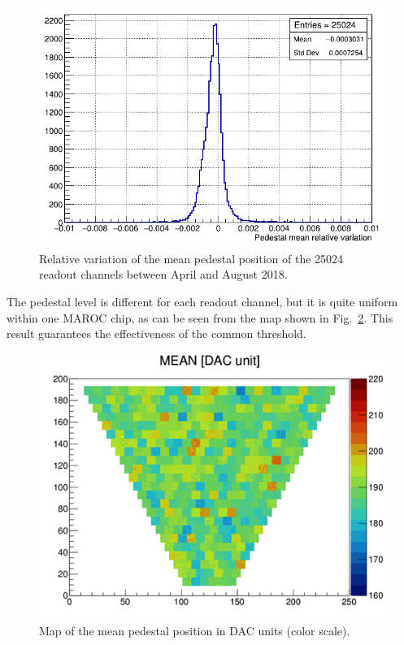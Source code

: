 \documentclass[5p,times,twocolumn]{elsarticle}
\begin{document}
\begin{figure}[t]
\begin{center}
\includegraphics[width=1.0\columnwidth]{PedestalMeanVariation.png}
\end{center}
\caption{Relative variation of the mean pedestal position of the 25024 readout channels between April and August
  2018.}
\label{fig:PedestalMean}
\end{figure}

The pedestal level is different for each readout channel, but it is quite uniform within one MAROC chip, as can be
seen from the map shown in Fig.~\ref{fig:PedestalMap}. This result guarantees the effectiveness of the common
threshold.

\begin{figure}[t]
\begin{center}
\includegraphics[width=1.0\columnwidth]{PedestalMap.png}
\end{center}
\caption{Map of the mean pedestal position in DAC units (color scale).}
\label{fig:PedestalMap}
\end{figure}
\end{document}
